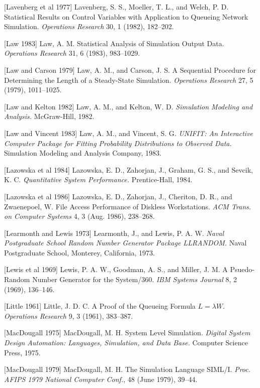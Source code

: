 [Lavenberg et al 1977] Lavenberg, S. S., Moeller, T. L., and Welch, P. D. Statistical Results on Control Variables with Application to Queueing Network Simulation. \textit{Operations Research} 30, 1 (1982), 182--202.

[Law 1983] Law, A. M. Statistical Analysis of Simulation Output Data. \textit{Operations Research} 31, 6 (1983), 983--1029.

[Law and Carson 1979] Law, A. M., and Carson, J. S. A Sequential Procedure for Determining the Length of a Steady-State Simulation. \textit{Operations Research} 27, 5 (1979), 1011--1025.

[Law and Kelton 1982] Law, A. M., and Kelton, W. D. \textit{Simulation Modeling and Analysis.} McGraw-Hill, 1982.

[Law and Vincent 1983] Law, A. M., and Vincent, S. G. \textit{UNIFIT: An Interactive Computer Package for Fitting Probability Distributions to Observed Data.} Simulation Modeling and Analysis Company, 1983.

[Lazowska et al 1984] Lazowska, E. D., Zahorjan, J., Graham, G. S., and Sevcik, K. C. \textit{Quantitative System Performance.} Prentice-Hall, 1984.

[Lazowska et al 1986] Lazowska, E. D., Zahorjan, J., Cheriton, D. R., and Zwaenepoel, W. File Access Performance of Diskless Workstations. \textit{ACM Trans. on Computer Systems} 4, 3 (Aug. 1986), 238--268.

[Learmonth and Lewis 1973] Learmonth, J., and Lewis, P. A. W. \textit{Naval Postgraduate School Random Number Generator Package LLRANDOM.} Naval Postgraduate School, Monterey, California, 1973.

[Lewis et al 1969] Lewis, P. A. W., Goodman, A. S., and Miller, J. M. A Psuedo-Random Number Generator for the System/360. \textit{IBM Systems Journal} 8, 2 (1969), 136--146.

[Little 1961] Little, J. D. C. A Proof of the Queueing Formula $L=\lambda W$. \textit{Operations Research} 9, 3 (1961), 383--387.

[MacDougall 1975] MacDougall, M. H. System Level Simulation. \textit{Digital System Design Automation: Languages, Simulation, and Data Base.} Computer Science Press, 1975.

[MacDougall 1979] MacDougall, M. H. The Simulation Language SIML/I. \textit{Proc. AFIPS 1979 National Computer Conf.}, 48 (June 1979), 39--44.


